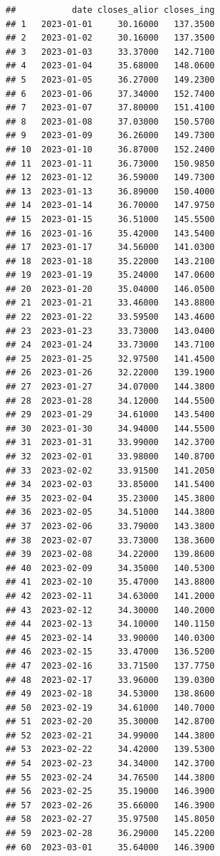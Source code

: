 \documentclass[
]{article}
\begin{document}
\begin{verbatim}
##           date closes_alior closes_ing
## 1   2023-01-01     30.16000   137.3500
## 2   2023-01-02     30.16000   137.3500
## 3   2023-01-03     33.37000   142.7100
## 4   2023-01-04     35.68000   148.0600
## 5   2023-01-05     36.27000   149.2300
## 6   2023-01-06     37.34000   152.7400
## 7   2023-01-07     37.80000   151.4100
## 8   2023-01-08     37.03000   150.5700
## 9   2023-01-09     36.26000   149.7300
## 10  2023-01-10     36.87000   152.2400
## 11  2023-01-11     36.73000   150.9850
## 12  2023-01-12     36.59000   149.7300
## 13  2023-01-13     36.89000   150.4000
## 14  2023-01-14     36.70000   147.9750
## 15  2023-01-15     36.51000   145.5500
## 16  2023-01-16     35.42000   143.5400
## 17  2023-01-17     34.56000   141.0300
## 18  2023-01-18     35.22000   143.2100
## 19  2023-01-19     35.24000   147.0600
## 20  2023-01-20     35.04000   146.0500
## 21  2023-01-21     33.46000   143.8800
## 22  2023-01-22     33.59500   143.4600
## 23  2023-01-23     33.73000   143.0400
## 24  2023-01-24     33.73000   143.7100
## 25  2023-01-25     32.97500   141.4500
## 26  2023-01-26     32.22000   139.1900
## 27  2023-01-27     34.07000   144.3800
## 28  2023-01-28     34.12000   144.5500
## 29  2023-01-29     34.61000   143.5400
## 30  2023-01-30     34.94000   144.5500
## 31  2023-01-31     33.99000   142.3700
## 32  2023-02-01     33.98000   140.8700
## 33  2023-02-02     33.91500   141.2050
## 34  2023-02-03     33.85000   141.5400
## 35  2023-02-04     35.23000   145.3800
## 36  2023-02-05     34.51000   144.3800
## 37  2023-02-06     33.79000   143.3800
## 38  2023-02-07     33.73000   138.3600
## 39  2023-02-08     34.22000   139.8600
## 40  2023-02-09     34.35000   140.5300
## 41  2023-02-10     35.47000   143.8800
## 42  2023-02-11     34.63000   141.2000
## 43  2023-02-12     34.30000   140.2000
## 44  2023-02-13     34.10000   140.1150
## 45  2023-02-14     33.90000   140.0300
## 46  2023-02-15     33.47000   136.5200
## 47  2023-02-16     33.71500   137.7750
## 48  2023-02-17     33.96000   139.0300
## 49  2023-02-18     34.53000   138.8600
## 50  2023-02-19     34.61000   140.7000
## 51  2023-02-20     35.30000   142.8700
## 52  2023-02-21     34.99000   144.3800
## 53  2023-02-22     34.42000   139.5300
## 54  2023-02-23     34.34000   142.3700
## 55  2023-02-24     34.76500   144.3800
## 56  2023-02-25     35.19000   146.3900
## 57  2023-02-26     35.66000   146.3900
## 58  2023-02-27     35.97500   145.8050
## 59  2023-02-28     36.29000   145.2200
## 60  2023-03-01     35.64000   146.3900

\end{verbatim}
\end{document}
